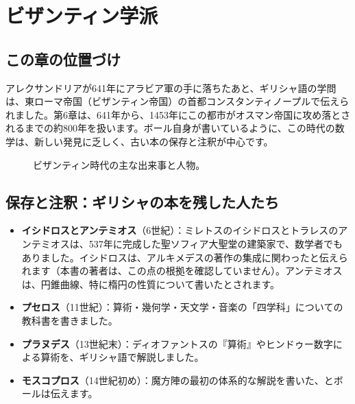 \documentclass[a4paper,11pt,openany]{ltjsbook}
\begin{document}
\chapter{ビザンティン学派}

\section{この章の位置づけ}

アレクサンドリアが641年にアラビア軍の手に落ちたあと、ギリシャ語の学問は、東ローマ帝国（ビザンティン帝国）の首都コンスタンティノープルで伝えられました。第6章は、641年から、1453年にこの都市がオスマン帝国に攻め落とされるまでの約800年を扱います。ボール自身が書いているように、この時代の数学は、新しい発見に乏しく、古い本の保存と注釈が中心です。

\begin{figure}[htbp]
\centering
{}
\caption{ビザンティン時代の主な出来事と人物。}
\end{figure}

\section{保存と注釈：ギリシャの本を残した人たち}

\begin{itemize}[leftmargin=*]
\item \textbf{イシドロスとアンテミオス}（6世紀）：ミレトスのイシドロスとトラレスのアンテミオスは、537年に完成した聖ソフィア大聖堂の建築家で、数学者でもありました。イシドロスは、アルキメデスの著作の集成に関わったと伝えられます（本書の著者は、この点の根拠を確認していません）。アンテミオスは、円錐曲線、特に楕円の性質について書いたとされます。
\item \textbf{プセロス}（11世紀）：算術・幾何学・天文学・音楽の「四学科」についての教科書を書きました。
\item \textbf{プラヌデス}（13世紀末）：ディオファントスの『算術』やヒンドゥー数字による算術を、ギリシャ語で解説しました。
\item \textbf{モスコプロス}（14世紀初め）：魔方陣の最初の体系的な解説を書いた、とボールは伝えます。
\end{itemize}
\end{document}
